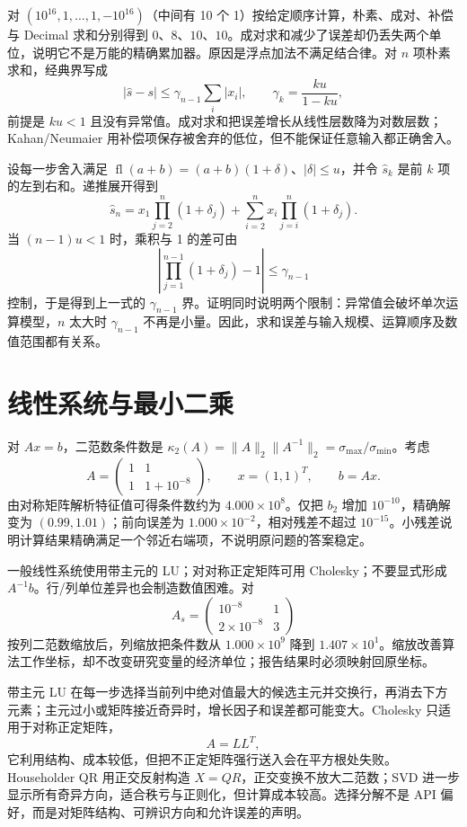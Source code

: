
对 $(10^{16},1,\ldots,1,-10^{16})$（中间有 10 个 1）按给定顺序计算，朴素、成对、补偿与 Decimal 求和分别得到 $0$、$8$、$10$、$10$。成对求和减少了误差却仍丢失两个单位，说明它不是万能的精确累加器。原因是浮点加法不满足结合律。对 $n$ 项朴素求和，经典界写成
\[
  |\widehat s-s|\le \gamma_{n-1}\sum_i|x_i|,
  \qquad \gamma_k=\frac{ku}{1-ku},
\]
前提是 $ku<1$ 且没有异常值。成对求和把误差增长从线性层数降为对数层数；Kahan/Neumaier 用补偿项保存被舍弃的低位，但不能保证任意输入都正确舍入。


设每一步舍入满足 $\operatorname{fl}(a+b)=(a+b)(1+\delta)$、$|\delta|\le u$，并令 $\widehat s_k$ 是前 $k$ 项的左到右和。递推展开得到
\[
 \widehat s_n
 =x_1\prod_{j=2}^{n}(1+\delta_j)
 +\sum_{i=2}^n x_i\prod_{j=i}^{n}(1+\delta_j).
\]
当 $(n-1)u<1$ 时，乘积与 1 的差可由
\[
 \left|\prod_{j=1}^{n-1}(1+\delta_j)-1\right|
 \le\gamma_{n-1}
\]
控制，于是得到上一式的 $\gamma_{n-1}$ 界。证明同时说明两个限制：异常值会破坏单次运算模型，$n$ 太大时 $\gamma_{n-1}$ 不再是小量。因此，求和误差与输入规模、运算顺序及数值范围都有关系。

\section{线性系统与最小二乘}

对 $Ax=b$，二范数条件数是 $\kappa_2(A)=\|A\|_2\|A^{-1}\|_2=\sigma_{\max}/\sigma_{\min}$。考虑
\[
 A=\begin{pmatrix}1&1\\1&1+10^{-8}\end{pmatrix},
 \qquad x=(1,1)^T,\qquad b=Ax.
\]
由对称矩阵解析特征值可得条件数约为 $4.000\times10^8$。仅把 $b_2$ 增加 $10^{-10}$，精确解变为 $(0.99,1.01)$；前向误差为 $1.000\times10^{-2}$，相对残差不超过 $10^{-15}$。小残差说明计算结果精确满足一个邻近右端项，不说明原问题的答案稳定。

一般线性系统使用带主元的 LU；对对称正定矩阵可用 Cholesky；不要显式形成 $A^{-1}b$。行/列单位差异也会制造数值困难。对
\[
  A_s=\begin{pmatrix}10^{-8}&1\\2\times10^{-8}&3\end{pmatrix}
\]
按列二范数缩放后，列缩放把条件数从 $1.000\times10^9$ 降到 $1.407\times10^1$。缩放改善算法工作坐标，却不改变研究变量的经济单位；报告结果时必须映射回原坐标。


带主元 LU 在每一步选择当前列中绝对值最大的候选主元并交换行，再消去下方元素；主元过小或矩阵接近奇异时，增长因子和误差都可能变大。Cholesky 只适用于对称正定矩阵，
\[
 A=LL^T,
\]
它利用结构、成本较低，但把不正定矩阵强行送入会在平方根处失败。Householder QR 用正交反射构造 $X=QR$，正交变换不放大二范数；SVD 进一步显示所有奇异方向，适合秩亏与正则化，但计算成本较高。选择分解不是 API 偏好，而是对矩阵结构、可辨识方向和允许误差的声明。

